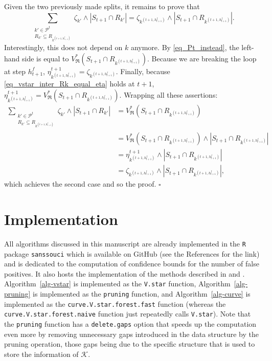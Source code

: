 \documentclass[
  11pt,
  a4paper,
]{article}
\theoremstyle{plain}
\theoremstyle{plain}
\theoremstyle{plain}
\theoremstyle{definition}
\theoremstyle{definition}
\theoremstyle{remark}
\begin{document}
Given the two previously made splits, it remains to prove that
\begin{equation*}
\sum_{\substack{k'\in\mathcal{P}^{t}\\R_{k'}\subseteq  R_{  k^{(t+1,h^f_{t+1})}} }} \zeta_{k'}\wedge |S_{t+1}\cap R_{k'}| =  \zeta_{ k^{(t+1,h^f_{t+1})}}\wedge |S_{t+1}\cap R_{ k^{(t+1,h^f_{t+1})}}|.
\end{equation*} Interestingly, this does not depend on \(k\) anymore. By
\eqref{eq_Pt_instead}, the left-hand side is equal to
\(V^*_{\mathfrak{R}}( S_{t+1}\cap  R_{  k^{(t+1,h^f_{t+1})}  } )\).
Because we are breaking the loop at step \(h^f_{t+1}\),
\(\eta^{t+1}_{k^{(t+1,h^f_{t+1})} }= \zeta_{ k^{(t+1,h^f_{t+1})}}\).
Finally, because \eqref{eq_vstar_inter_Rk_equal_eta} holds at \(t+1\),
\(\eta^{t+1}_{k^{(t+1,h^f_{t+1})} }=V^*_{\mathfrak{R}}( S_{t+1}\cap  R_{  k^{(t+1,h^f_{t+1})}  } )\).
Wrapping all these assertions: \begin{align*}
\sum_{\substack{k'\in\mathcal{P}^{t}\\R_{k'}\subseteq  R_{  k^{(t+1,h^f_{t+1})}} }} \zeta_{k'}\wedge |S_{t+1}\cap R_{k'}| &= V^*_{\mathfrak{R}}( S_{t+1}\cap  R_{  k^{(t+1,h^f_{t+1})}  } )\\
&=V^*_{\mathfrak{R}}( S_{t+1}\cap  R_{  k^{(t+1,h^f_{t+1})}  } )\wedge  |S_{t+1}\cap R_{ k^{(t+1,h^f_{t+1})}}|\\
&=\eta^{t+1}_{k^{(t+1,h^f_{t+1})} }\wedge  |S_{t+1}\cap R_{ k^{(t+1,h^f_{t+1})}}|\\
&=  \zeta_{ k^{(t+1,h^f_{t+1})}}\wedge |S_{t+1}\cap R_{ k^{(t+1,h^f_{t+1})}}|,
\end{align*} which achieves the second case and so the proof.
\(\square\)

\section{Implementation}\label{sec-implementation}

All algorithms discussed in this manuscript are already implemented in
the \texttt{R} \citep{R-base} package \texttt{sanssouci}
\citep{sanssouci} which is available on GitHub (see the References for
the link) and is dedicated to the computation of confidence bounds for
the number of false positives. It also hosts the implementation of the
methods described in \citet{MR4124323} and
\citet{10.1093/bioinformatics/btac693}.  Algorithm~\ref{alg-vstar}  is
implemented as the \texttt{V.star} function,
 Algorithm~\ref{alg-pruning}  is implemented as the \texttt{pruning}
function, and  Algorithm~\ref{alg-curve}  is implemented as the
\texttt{curve.V.star.forest.fast} function (whereas the
\texttt{curve.V.star.forest.naive} function just repeatedly calls
\texttt{V.star}). Note that the \texttt{pruning} function has a
\texttt{delete.gaps} option that speeds up the computation even more by
removing unnecessary gaps introduced in the data structure by the
pruning operation, those gaps being due to the specific structure that
is used to store the information of \(\mathcal{K}\).
\end{document}
